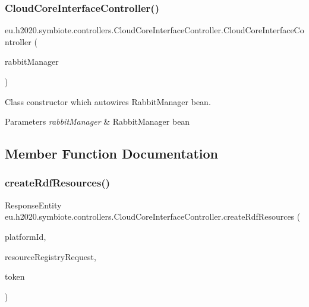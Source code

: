 \subsubsection{\texorpdfstring{Cloud\+Core\+Interface\+Controller()}{CloudCoreInterfaceController()}}
{\footnotesize\ttfamily eu.\+h2020.\+symbiote.\+controllers.\+Cloud\+Core\+Interface\+Controller.\+Cloud\+Core\+Interface\+Controller (\begin{DoxyParamCaption}\item[{\hyperlink{classeu_1_1h2020_1_1symbiote_1_1communication_1_1RabbitManager}{Rabbit\+Manager}}]{rabbit\+Manager }\end{DoxyParamCaption})}

Class constructor which autowires Rabbit\+Manager bean.


\begin{DoxyParams}{Parameters}
{\em rabbit\+Manager} & Rabbit\+Manager bean \\
\hline
\end{DoxyParams}


\subsection{Member Function Documentation}
\mbox{\label{classeu_1_1h2020_1_1symbiote_1_1controllers_1_1CloudCoreInterfaceController_aba49d96dd88fb9c2e40da1ef1407f920}} 
\subsubsection{\texorpdfstring{create\+Rdf\+Resources()}{createRdfResources()}}
{\footnotesize\ttfamily Response\+Entity eu.\+h2020.\+symbiote.\+controllers.\+Cloud\+Core\+Interface\+Controller.\+create\+Rdf\+Resources (\begin{DoxyParamCaption}\item[{@Path\+Variable(\char`\"{}platform\+Id\char`\"{}) String}]{platform\+Id,  }\item[{@Request\+Body R\+D\+F\+Resource\+Registry\+Request}]{resource\+Registry\+Request,  }\item[{@Request\+Header(\char`\"{}X-\/Auth-\/Token\char`\"{}) String}]{token }\end{DoxyParamCaption})}

